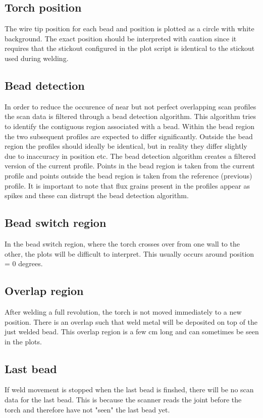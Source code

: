 \documentclass[12pt,a4paper]{report}
\begin{document}
\subsection{Torch position}
The wire tip position for each bead and position is plotted as a circle with white background. The exact position should be interpreted with 
caution since it requires that the stickout configured in the plot script is identical to the stickout used during welding.

\subsection{Bead detection}
In order to reduce the occurence of near but not perfect overlapping scan profiles the scan data is filtered through
a bead detection algorithm. This algorithm tries to identify the contiguous region associated with a bead. Within the bead region
the two subsequent profiles are expected to differ significantly. Outside the bead region the profiles should ideally be identical, but in reality
they differ slightly due to inaccuracy in position etc. The bead detection algorithm creates a filtered version of the current profile. Points in
the bead region is taken from the current profile and points outside the bead region is taken from the reference (previous) profile.
It is important to note that flux grains present in the profiles appear as spikes and these can distrupt the bead detection algorithm.

\subsection{Bead switch region}
In the bead switch region, where the torch crosses over from one wall to the other, the plots will be difficult to interpret. This usually
occurs around position = 0 degrees.

\subsection{Overlap region}
After welding a full revolution, the torch is not moved immediately to a new position. There is an overlap such that weld metal will 
be deposited on top of the just welded bead. This overlap region is a few cm long and can sometimes be seen in the plots.

\subsection{Last bead}
If weld movement is stopped when the last bead is finshed, there will be no scan data for the last bead. This is because the scanner reads
the joint before the torch and therefore have not "seen" the last bead yet.
\end{document}
